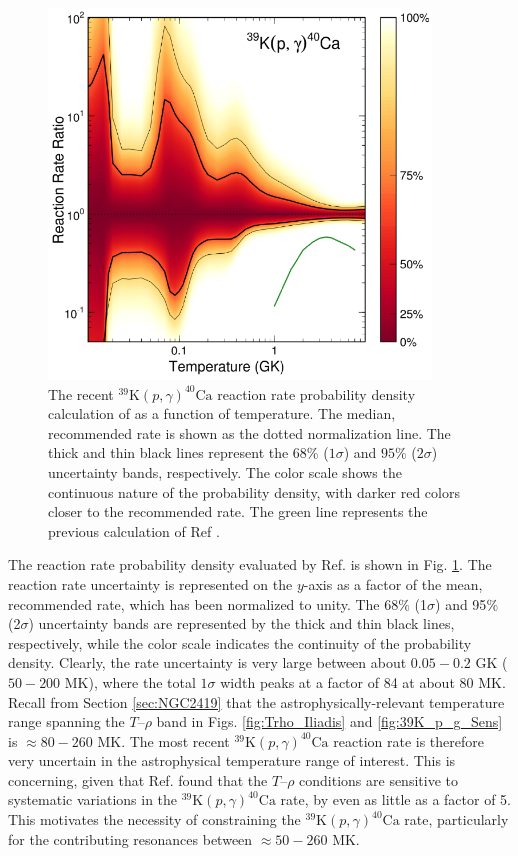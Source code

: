 \begin{figure}[t]
\centering
\includegraphics[width=4in]{Chapter-6/figs/39K_p_g_Longland2018.png}
\caption{\label{fig:39K_p_g_Longland}The recent $^{39}\mathrm{K}(p,\gamma)^{40}\mathrm{Ca}$ reaction rate probability density calculation of \cite{Longland2018} as a function of temperature. The median, recommended rate is shown as the dotted normalization line. The thick and thin black lines represent the $68\%$ ($1\sigma$) and $95\%$ ($2\sigma$) uncertainty bands, respectively. The color scale shows the continuous nature of the probability density, with darker red colors closer to the recommended rate. The green line represents the previous calculation of Ref \cite{Cheng1981}.}
\end{figure}

The reaction rate probability density evaluated by Ref. \cite{Longland2018} is shown in Fig. \ref{fig:39K_p_g_Longland}. The reaction rate uncertainty is represented on the $y$-axis as a factor of the mean, recommended rate, which has been normalized to unity. The 68$\%$ (1$\sigma$) and 95$\%$ (2$\sigma$) uncertainty bands are represented by the thick and thin black lines, respectively, while the color scale indicates the continuity of the probability density. Clearly, the rate uncertainty is very large between about $0.05-0.2$ GK ($50-200$ MK), where the total $1\sigma$ width peaks at a factor of 84 at about 80 MK. Recall from Section \ref{sec:NGC2419} that the astrophysically-relevant temperature range spanning the $T$--$\rho$ band in Figs. \ref{fig:Trho_Iliadis} and \ref{fig:39K_p_g_Sens} is $\approx80-260$ MK. The most recent $^{39}\mathrm{K}(p,\gamma)^{40}\mathrm{Ca}$ reaction rate is therefore very uncertain in the astrophysical temperature range of interest. This is concerning, given that Ref. \cite{Dermigny2017} found that the $T$--$\rho$ conditions are sensitive to systematic variations in the $^{39}\mathrm{K}(p,\gamma)^{40}\mathrm{Ca}$ rate, by even as little as a factor of 5. This motivates the necessity of constraining the $^{39}\mathrm{K}(p,\gamma)^{40}\mathrm{Ca}$ rate, particularly for the contributing resonances between $\approx50-260$ MK.

